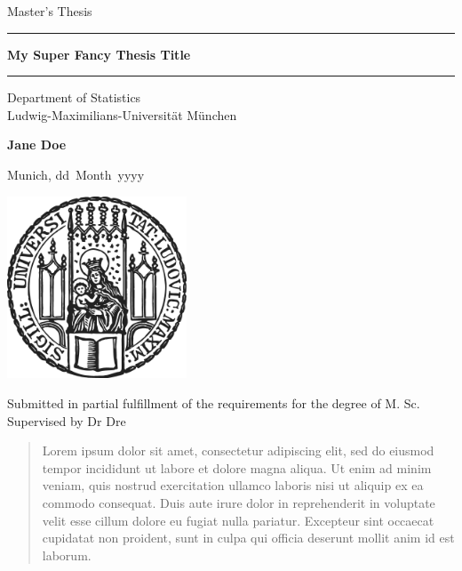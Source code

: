\documentclass[
]{scrartcl}
\author{}
\date{\vspace{-2.5em}}
\newcommand{\mytitle}{My Super Fancy Thesis Title}
\newcommand{\myname}{Jane Doe}
\newcommand{\mysupervisor}{Dr Dre}
\newcommand{\dueday}{dd}
\newcommand{\duemonth}{Month}
\newcommand{\dueyear}{yyyy}
\begin{document}

\begin{titlepage}
\begin{center}

\LARGE
Master's Thesis

\vspace{0.5cm}

\rule{\textwidth}{1.5pt}
\LARGE
\textbf{\mytitle}
\rule{\textwidth}{1.5pt}

\vspace{0.5cm}

\large
Department of Statistics \\
Ludwig-Maximilians-Universität München

\vfill

\Large
\textbf{\myname}

\vfill

\large
Munich, \dueday~\duemonth~\dueyear

\vfill

\includegraphics[width = 0.4\textwidth]{params/sigillum.png}

\vfill

\normalsize
Submitted in partial fulfillment of the requirements for the degree of M. Sc.
\\

Supervised by \mysupervisor

\end{center}
\end{titlepage}

\newpage

\begin{abstract}

Lorem ipsum dolor sit amet, consectetur adipiscing elit, sed do eiusmod tempor
incididunt ut labore et dolore magna aliqua. Ut enim ad minim veniam, quis
nostrud exercitation ullamco laboris nisi ut aliquip ex ea commodo consequat.
Duis aute irure dolor in reprehenderit in voluptate velit esse cillum dolore eu
fugiat nulla pariatur. Excepteur sint occaecat cupidatat non proident, sunt in
culpa qui officia deserunt mollit anim id est laborum.

\end{abstract}
\end{document}
